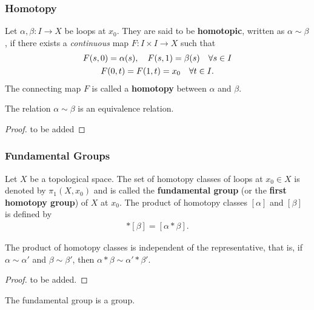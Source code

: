 \documentclass[10pt]{article}
\begin{document}
\subsubsection{Homotopy\label{sec:homotopy1}}
\begin{definition}[Homotopy]
    Let $\alpha,\beta:I\to X$ be loops at $x_0$.
    They are said to be \textbf{homotopic}, written as $\alpha\sim\beta$, if there exists a \textit{continuous} map $F:I\times I\to X$ such that
    \begin{gather}
        F(s,0)=\alpha(s),\quad F(s,1)=\beta(s)\quad \forall s\in I\notag\\
        F(0,t)=F(1,t)=x_0\quad\forall t\in I.\notag
    \end{gather}
    The connecting map $F$ is called a \textbf{homotopy} between $\alpha$ and $\beta$.
\end{definition}
\begin{proposition}
    The relation $\alpha\sim\beta$ is an equivalence relation.
\end{proposition}
\begin{proof}
    to be added
\end{proof}


\subsubsection{Fundamental Groups}
\begin{definition}
    Let $X$ be a topological space.
    The set of homotopy classes of loops at $x_0\in X$ is denoted by $\pi_1(X,x_0)$ and is called the \textbf{fundamental group} (or the \textbf{first homotopy group}) of $X$ at $x_0$.
    The product of homotopy classes $[\alpha]$ and $[\beta]$ is defined by
    \begin{align}
        [\alpha]* [\beta]=[\alpha*\beta].
    \end{align}
\end{definition}

\begin{lemma}
    The product of homotopy classes is independent of the representative, that is, if $\alpha\sim\alpha'$ and $\beta\sim\beta'$, then $\alpha*\beta\sim\alpha'*\beta'$.
\end{lemma}
\begin{proof}
    to be added.
\end{proof}

\begin{theorem}
    The fundamental group is a group.
\end{theorem}
\end{document}
